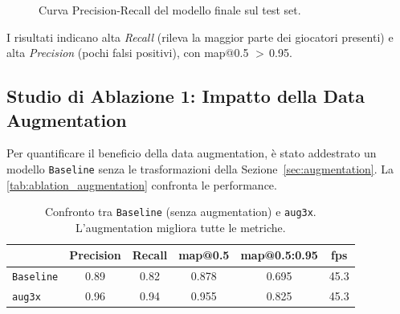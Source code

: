 \documentclass[12pt,a4paper,openright,twoside]{book}
\begin{document}
\begin{figure}[t]
  \centering
  \caption{Curva Precision-Recall del modello finale sul test set.}
  \label{fig:pr_curve_final}
\end{figure}

I risultati indicano alta \emph{Recall} (rileva la maggior parte dei giocatori presenti) e alta \emph{Precision} 
(pochi falsi positivi), con \ac{map}@0.5 $>\,$0.95.

\subsection{Studio di Ablazione 1: Impatto della Data Augmentation}
Per quantificare il beneficio della data augmentation, è stato addestrato un modello \texttt{Baseline} senza 
le trasformazioni della Sezione~\autoref{sec:augmentation}.
La \autoref{tab:ablation_augmentation} confronta le performance.

\begin{table}[t]
  \centering
  \caption{Confronto tra \texttt{Baseline} (senza augmentation) e \texttt{aug3x}. 
  L'augmentation migliora tutte le metriche.}
  \label{tab:ablation_augmentation}
  \begin{tabular}{l S[table-format=1.3] S[table-format=1.3] S[table-format=1.3] 
    S[table-format=1.3] S[table-format=2.1]}
    \toprule
    & {\textbf{Precision}} & {\textbf{Recall}} & {\textbf{\ac{map}@0.5}} & 
    {\textbf{\ac{map}@0.5:0.95}} & {\textbf{\ac{fps}}} \\
    \midrule
    \texttt{Baseline} & 0.89 & 0.82 & 0.878 & 0.695 & 45.3 \\
    \texttt{aug3x}    & 0.96 & 0.94 & 0.955 & 0.825 & 45.3 \\
    \bottomrule
  \end{tabular}
\end{table}
\end{document}
